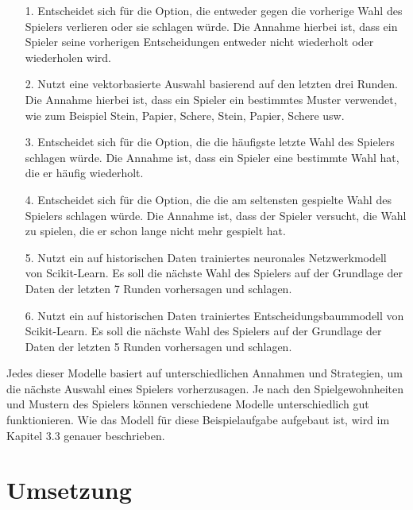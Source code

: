 \documentclass[thesis=paper,fancy]{hsmw-thesis}
\begin{document}
\begin{itemize}
	\item [1.] Entscheidet sich für die Option, die entweder gegen die vorherige Wahl des Spielers verlieren oder sie schlagen würde. Die Annahme hierbei ist, dass ein Spieler seine vorherigen Entscheidungen entweder nicht wiederholt oder wiederholen wird.
	\item [2.] Nutzt eine vektorbasierte Auswahl basierend auf den letzten drei Runden. Die Annahme hierbei ist, dass ein Spieler ein bestimmtes Muster verwendet, wie zum Beispiel Stein, Papier, Schere, Stein, Papier, Schere usw.
	\item [3.] Entscheidet sich für die Option, die die häufigste letzte Wahl des Spielers schlagen würde. Die Annahme ist, dass ein Spieler eine bestimmte Wahl hat, die er häufig wiederholt.
	\item [4.] Entscheidet sich für die Option, die die am seltensten gespielte Wahl des Spielers schlagen würde. Die Annahme ist, dass der Spieler versucht, die Wahl zu spielen, die er schon lange nicht mehr gespielt hat.
	\item [5.] Nutzt ein auf historischen Daten trainiertes neuronales Netzwerkmodell von Scikit-Learn. Es soll die nächste Wahl des Spielers auf der Grundlage der Daten der letzten 7 Runden vorhersagen und schlagen.
	\item [6.] Nutzt ein auf historischen Daten trainiertes Entscheidungsbaummodell von Scikit-Learn. Es soll die nächste Wahl des Spielers auf der Grundlage der Daten der letzten 5 Runden vorhersagen und schlagen.  
\end{itemize}

Jedes dieser Modelle basiert auf unterschiedlichen Annahmen und Strategien, um die nächste Auswahl eines Spielers vorherzusagen. Je nach den Spielgewohnheiten und Mustern des Spielers können verschiedene Modelle unterschiedlich gut funktionieren. \cite{AustinFischer.2021}
Wie das Modell für diese Beispielaufgabe aufgebaut ist, wird im Kapitel 3.3 genauer beschrieben.

\chapter{Umsetzung}
\end{document}
